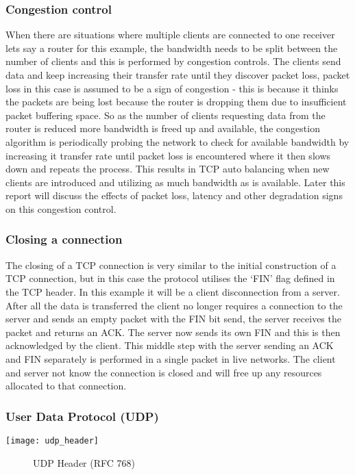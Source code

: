 \subsubsection*{Congestion control}
When there are situations where multiple clients are connected to one receiver lets say a router for this example, the bandwidth needs to be split between the number of clients and this is performed by congestion controls. The clients send data and keep increasing their transfer rate until they discover packet loss, packet loss in this case is assumed to be a sign of congestion - this is because it thinks the packets are being lost because the router is dropping them due to insufficient packet buffering space. So as the number of clients requesting data from the router is reduced more bandwidth is freed up and available, the congestion algorithm is periodically probing the network to check for available bandwidth by increasing it transfer rate until packet loss is encountered where it then slows down and repeats the process. This results in TCP auto balancing when new clients are introduced and utilizing as much bandwidth as is available. Later this report will discuss the effects of packet loss, latency and other degradation signs on this congestion control.

\subsubsection*{Closing a connection}
The closing of a TCP connection is very similar to the initial construction of a TCP connection, but in this case the protocol utilises the `FIN' flag defined in the TCP header. In this example it will be a client disconnection from a server. After all the data is transferred the client no longer requires a connection to the server and sends an empty packet with the FIN bit send, the server receives the packet and returns an ACK. The server now sends its own FIN and this is then acknowledged by the client. This middle step with the server sending an ACK and FIN separately is performed in a single packet in live networks. The client and server not know the connection is closed and will free up any resources allocated to that connection.

\clearpage
\subsubsection{User Data Protocol (UDP)}
\begin{center}
	\texttt{[image: udp\_header]}
	\begin{figure}[h]
		\caption{UDP Header (RFC 768)}
	\end{figure}		
\end{center}

